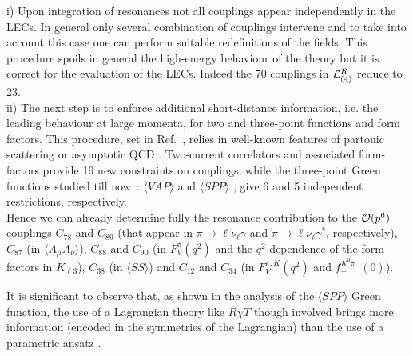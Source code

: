 \documentclass{appolb}
\begin{document}
{i) Upon integration of resonances not all couplings appear independently in the LECs. In general only several 
combination of couplings intervene and to take into account this case one can perform suitable redefinitions of
the fields. This procedure
spoils in general the high-energy behaviour of the theory but it is correct for the evaluation of the LECs. Indeed
the 70 couplings in ${\cal L}_{(4)}^R$ reduce to 23. \vspace*{0.1cm} \\
ii) 
The next step is to enforce additional short-distance information, i.e. the leading behaviour at large momenta, for 
two and three-point functions and form factors. This procedure, set in Ref.~\cite{Ecker:1989yg}, relies in well-known
features of partonic scattering or asymptotic QCD \cite{Froissart:1961ux}. 
Two-current correlators and associated form-factors provide 19 new constraints on couplings, while the three-point
Green functions studied till now~: $\langle VAP \rangle$ \cite{Cirigliano:2004ue} and $\langle SPP \rangle$
\cite{Cirigliano:2006hb,Cirigliano:2005xn}, give 6 and 5 independent restrictions, respectively. 
\vspace*{0.2cm} \\
\hspace*{0.5cm} Hence we can already determine
fully the resonance contribution to the ${\cal O}(p^6)$ couplings $C_{78}$ and $C_{89}$ (that appear in $\pi \rightarrow 
\ell \nu_{\ell} \gamma$ and $\pi \rightarrow \ell \nu_{\ell} \gamma^*$, respectively), $C_{87}$ (in 
$\langle A_{\mu}  A_{\nu} \rangle$), $C_{88}$ and $C_{90}$ (in $F_V^{\pi}(q^2)$ and the $q^2$ dependence of the
form factors in $K_{\ell 3}$), $C_{38}$ (in
$\langle SS \rangle$) and $C_{12}$ and $C_{34}$ (in $F_V^{\pi,K}(q^2)$ and $f_+^{K^0 \pi^-}(0)$). 
\par
It is significant to observe that, as shown in the analysis of the $\langle SPP \rangle$ Green function, the use of 
a Lagrangian theory like $R \chi T$ though involved \cite{Cirigliano:2006hb} brings more information (encoded
in the symmetries of the Lagrangian) than the use of a parametric ansatz \cite{Cirigliano:2005xn}.

}
\end{document}
